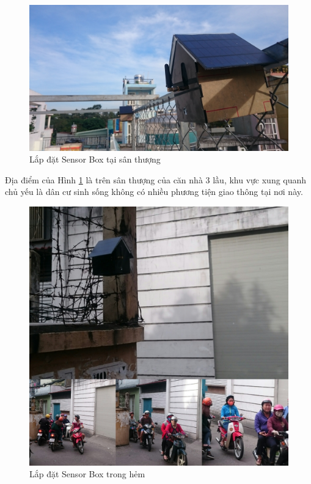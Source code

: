 \begin{figure}[H]
	\centering    
	\includegraphics[width=6in]{sensorbox_1}
	\caption[Lắp đặt Sensor Box tại sân thượng]{Lắp đặt Sensor Box tại sân thượng}
	\label{fig:sensorbox_1}
\end{figure}
Địa điểm của Hình \ref{fig:sensorbox_1} là trên sân thượng của căn nhà 3 lầu, khu vực xung quanh chủ yếu là dân cư sinh sống không có nhiều phương tiện giao thông tại nơi này.
\begin{figure}[H]
	\centering    
	\includegraphics[width=6in]{sensorbox_2}
	\caption[Lắp đặt Sensor Box trong hẻm]{Lắp đặt Sensor Box trong hẻm}
	\label{fig:sensorbox_2}
\end{figure}


